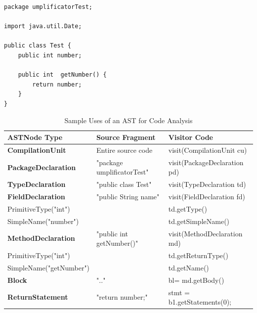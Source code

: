 \begin{lstlisting}[style=java, caption=Test.java, label=lst:astjava]
package umplificatorTest;

import java.util.Date;

public class Test {
	public int number;
	
	public int  getNumber() {
		return number;
	}
}
\end{lstlisting}

\newcommand*{\MyIndent}{\hspace*{0.4cm}}%
\begin{table}[h]
\caption{Sample Uses of an AST for Code Analysis}
\label{table:astanalysis}
\begin{tabularx}{\textwidth}{l|YY}
\toprule
{}
\textbf{ASTNode Type} & \textbf{Source Fragment}  & \textbf{Visitor Code}  \\ \hline	
\textbf{CompilationUnit} &  Entire source code & visit(CompilationUnit cu) \\ \hline
\MyIndent \textbf{PackageDeclaration} & "package umplificatorTest" & visit(PackageDeclaration pd) \\ \hline
\MyIndent \textbf{TypeDeclaration} &  "public class Test" & visit(TypeDeclaration td) \\ \hline
\MyIndent \MyIndent \textbf{FieldDeclaration} &  "public String name" & visit(FieldDeclaration fd) \\ 
\MyIndent \MyIndent \MyIndent PrimitiveType("int") &   & \MyIndent td.getType() \\ 
\MyIndent \MyIndent \MyIndent SimpleName("number") &   & \MyIndent td.getSimpleName() \\ \hline
\MyIndent \MyIndent \textbf{MethodDeclaration} &  "public int getNumber()" & visit(MethodDeclaration md) \\ 
\MyIndent \MyIndent \MyIndent PrimitiveType("int") &   & \MyIndent td.getReturnType() \\ 
\MyIndent \MyIndent \MyIndent SimpleName("getNumber") &   & \MyIndent td.getName() \\ \hline
\MyIndent \MyIndent \MyIndent \MyIndent \textbf{Block} & "{..}"& \MyIndent bl=  md.getBody() \\ 
\MyIndent \MyIndent \MyIndent  \MyIndent \MyIndent \textbf{ReturnStatement} &  "return number;" & stmt = b1.getStatements(0); \\ \hline
\end{tabularx}
\end{table}


